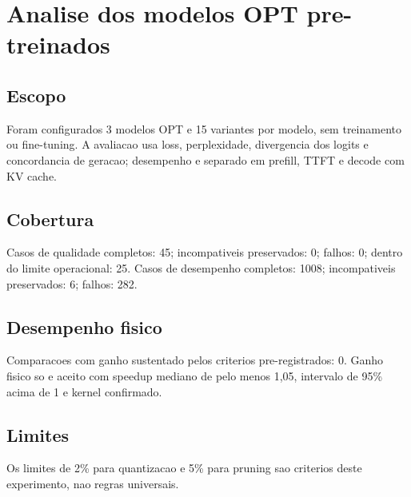 \chapter{Analise dos modelos OPT pre-treinados}
\section{Escopo}
Foram configurados 3 modelos OPT e 15 variantes por modelo, sem treinamento ou fine-tuning.
A avaliacao usa loss, perplexidade, divergencia dos logits e concordancia de geracao; desempenho e separado em prefill, TTFT e decode com KV cache.
\section{Cobertura}
Casos de qualidade completos: 45; incompativeis preservados: 0; falhos: 0; dentro do limite operacional: 25.
Casos de desempenho completos: 1008; incompativeis preservados: 6; falhos: 282.
\section{Desempenho fisico}
Comparacoes com ganho sustentado pelos criterios pre-registrados: 0.
Ganho fisico so e aceito com speedup mediano de pelo menos 1,05, intervalo de 95\% acima de 1 e kernel confirmado.
\section{Limites}
Os limites de 2\% para quantizacao e 5\% para pruning sao criterios deste experimento, nao regras universais.
